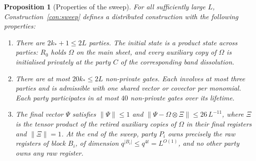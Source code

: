 \documentclass[aps,prx,reprint,superscriptaddress,floatfix,nofootinbib,longbibliography,amsmath,amssymb]{revtex4-2}
\newcommand{\norm}[1]{\lVert #1\rVert}
\newcommand{\abs}[1]{\lvert #1\rvert}
\newcommand{\Om}{\Omega}
\theoremstyle{plain}
\newtheorem{proposition}[theorem]{Proposition}
\theoremstyle{definition}
\begin{document}
\begin{proposition}[Properties of the sweep]\label{prop:sweep}
For all sufficiently large $L$, Construction~\ref{con:sweep} defines a
distributed construction with the following properties:
\begin{enumerate}[leftmargin=2em]
\item There are $2k_*+1\le 2L$ parties. The initial state is a product state across
parties: $R_0$ holds $\Om$ on the main sheet, and every auxiliary copy of $\Om$ is initialised
privately at the party $C$ of the corresponding band dissolution.
\item There are at most $20k_*\le 2L$ non-private gates. Each involves at
most three parties and is admissible with one shared vector or covector
per monomial. Each party participates in at most $40$ non-private gates
over its lifetime.
\item The final vector $\Psi$ satisfies $\norm\Psi\le1$ and
$\norm{\Psi-\Om\otimes\Xi}\le 26\,L^{-11}$, where $\Xi$ is the tensor
product of the retired auxiliary copies of $\Om$ in their final registers
and $\norm\Xi=1$. At the end of the sweep, party $P_i$ owns precisely the raw registers
of block $B_i$, of dimension $q^{\abs{B_i}}\le q^{4t}=L^{O(1)}$, and no other
party owns any raw register.
\end{enumerate}
\end{proposition}
\end{document}
